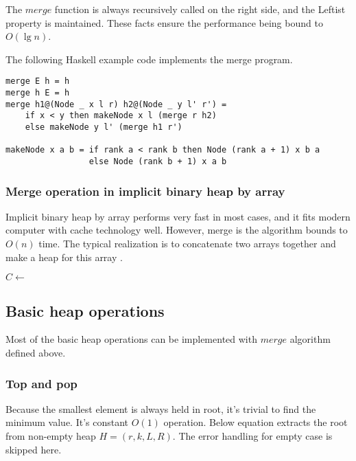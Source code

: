 \documentclass{article}
\begin{document}
The $merge$ function is always recursively called on the right side,
and the Leftist property is maintained. These facts ensure the performance
being bound to $O(\lg n)$.

The following Haskell example code implements the merge program.

\lstset{language=Haskell}
\begin{lstlisting}
merge E h = h
merge h E = h
merge h1@(Node _ x l r) h2@(Node _ y l' r') =
    if x < y then makeNode x l (merge r h2)
    else makeNode y l' (merge h1 r')

makeNode x a b = if rank a < rank b then Node (rank a + 1) x b a
                 else Node (rank b + 1) x a b
\end{lstlisting}

\subsubsection{Merge operation in implicit binary heap by array}

Implicit binary heap by array performs very fast in most cases, and
it fits modern computer with cache technology well. However, merge
is the algorithm bounds to $O(n)$ time. The typical realization is to
concatenate two arrays together and make a heap for this array \cite{NIST}.

\begin{algorithmic}[1]
  \State $C \gets$ 
  \State {}
\EndFunction
\end{algorithmic}

\subsection{Basic heap operations}

Most of the basic heap operations can be implemented with $merge$
algorithm defined above.

\subsubsection{Top and pop}
Because the smallest element is always held in root, it's trivial
to find the minimum value. It's constant $O(1)$ operation. Below
equation extracts the root from non-empty heap $H = (r, k, L, R)$.
The error handling for empty case is skipped here.
\end{document}
